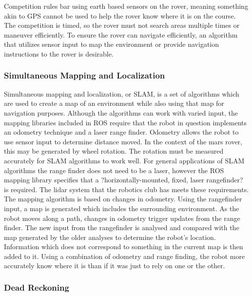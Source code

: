 \documentclass[10pt, oneside,onecolumn]{IEEEtran}
\begin{document}
Competition rules bar using earth based sensors on the rover, meaning something akin to GPS cannot be used to help the rover know where it is on the course. The competition is timed, so the rover must not search areas multiple times or maneuver efficiently. To ensure the rover can navigate efficiently, an algorithm that utilizes sensor input to map the environment or provide navigation instructions to the rover is desirable. 

\subsubsection{Simultaneous Mapping and Localization}

	Simultaneous mapping and localization, or SLAM, is a set of algorithms which are used to create a map of an environment while also using that map for navigation purposes. Although the algorithms can work with varied input, the mapping libraries included in ROS require that the robot in question implements an odometry technique and a laser range finder. Odometry allows the robot to use sensor input to determine distance moved. In the context of the mars rover, this may be generated by wheel rotation. The rotation must be measured accurately for SLAM algorithms to work well. For general applications of SLAM algorithms the range finder does not need to be a laser, however the ROS mapping library specifies that a ?horizontally-mounted, fixed, laser rangefinder? is required. The lidar system that the robotics club has meets these requirements. 
The mapping algorithm is based on changes in odometry. Using the rangefinder input, a map is generated which includes the surrounding environment. As the robot moves along a path, changes in odometry trigger updates from the range finder. The new input from the rangefinder is analysed and compared with the map generated by the older analyses to determine the robot's location. Information which does not correspond to something in the current map is then added to it. Using a combination of odometry and range finding, the robot more accurately know where it is than if it was just to rely on one or the other. 

\subsubsection{Dead Reckoning}
\end{document}

